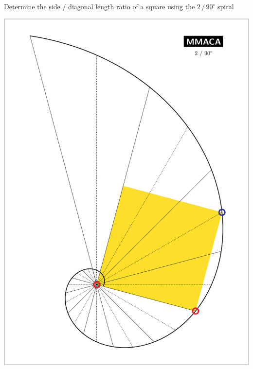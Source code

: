 \documentclass[a4paper,12pt]{article}
\begin{document}
    \begin{center}
    
        \large

        Determine the side / diagonal length ratio of a square using the $2 \, / \, 90^{\circ}$ spiral

        \bigskip \bigskip \bigskip
    
        \includegraphics[scale=0.7071]{./pictures/Example_07}

    \end{center}

    \newpage

\end{document}
